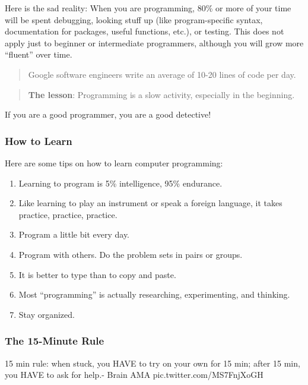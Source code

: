 \documentclass[]{book}
\providecommand{\tightlist}{%
  \setlength{\itemsep}{0pt}\setlength{\parskip}{0pt}}
\begin{document}
Here is the sad reality: When you are programming, 80\% or more of your
time will be spent debugging, looking stuff up (like program-specific
syntax, documentation for packages, useful functions, etc.), or testing.
This does not apply just to beginner or intermediate programmers,
although you will grow more ``fluent'' over time.

\begin{quote}
Google software engineers write an average of 10-20 lines of code per
day.
\end{quote}

\begin{quote}
\textbf{The lesson}: Programming is a slow activity, especially in the
beginning.
\end{quote}

If you are a good programmer, you are a good detective!

\subsubsection*{How to Learn}\label{how-to-learn}

Here are some tips on how to learn computer programming:

\begin{enumerate}
\def\labelenumi{\arabic{enumi}.}
\tightlist
\item
  Learning to program is 5\% intelligence, 95\% endurance.
\item
  Like learning to play an instrument or speak a foreign language, it
  takes practice, practice, practice.
\item
  Program a little bit every day.
\item
  Program with others. Do the problem sets in pairs or groups.
\item
  It is better to type than to copy and paste.
\item
  Most ``programming'' is actually researching, experimenting, and
  thinking.
\item
  Stay organized.
\end{enumerate}

\subsubsection*{The 15-Minute Rule}\label{the-15-minute-rule}

15 min rule: when stuck, you HAVE to try on your own for 15 min; after
15 min, you HAVE to ask for help.- Brain AMA pic.twitter.com/MS7FnjXoGH
\end{document}

